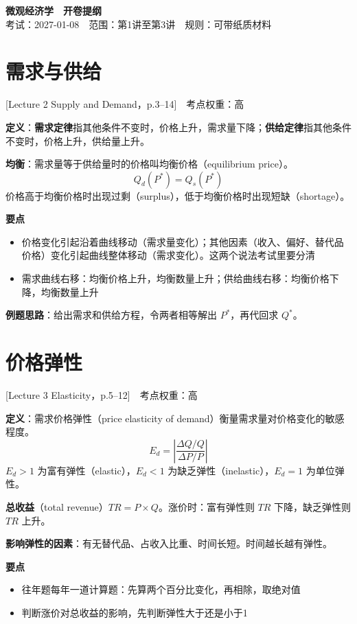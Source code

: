 \documentclass[a4paper,fontset=windows]{ctexart}
\newlength{\sbw}
\newcommand{\kw}[1]{\ifdefined\SBFILL\settowidth{\sbw}{#1}\underline{\hspace*{\dimexpr\sbw+0.6em\relax}}\else\textbf{#1}\fi}
\newcommand{\src}[1]{{\small\color{gray}[#1]}}
\begin{document}
\begin{center}
{\LARGE\bfseries 微观经济学　开卷提纲}\\[4pt]
{\small 考试：2027-01-08　范围：第1讲至第3讲　规则：可带纸质材料}
\end{center}
\setcounter{tocdepth}{2}
\tableofcontents

\section{需求与供给}\label{sec:sd}
\src{Lecture 2 Supply and Demand，p.3--14}　考点权重：高

\textbf{定义}：\kw{需求定律}指其他条件不变时，价格上升，需求量下降；\kw{供给定律}指其他条件不变时，价格上升，供给量上升。

\textbf{均衡}：需求量等于供给量时的价格叫均衡价格（equilibrium price）。
\[ Q_d(P^*) = Q_s(P^*) \]
价格高于均衡价格时出现过剩（surplus），低于均衡价格时出现短缺（shortage）。

\textbf{要点}
\begin{itemize}
\item 价格变化引起沿着曲线移动（需求量变化）；其他因素（收入、偏好、替代品价格）变化引起曲线整体移动（需求变化）。这两个说法考试里要分清
\item 需求曲线右移：均衡价格上升，均衡数量上升；供给曲线右移：均衡价格下降，均衡数量上升
\end{itemize}

\textbf{例题思路}：给出需求和供给方程，令两者相等解出 $P^*$，再代回求 $Q^*$。

\section{价格弹性}\label{sec:pe}
\src{Lecture 3 Elasticity，p.5--12}　考点权重：高

\textbf{定义}：需求价格弹性（price elasticity of demand）衡量需求量对价格变化的敏感程度。
\[ E_d = \left| \frac{\Delta Q / Q}{\Delta P / P} \right| \]
$E_d > 1$ 为富有弹性（elastic），$E_d < 1$ 为缺乏弹性（inelastic），$E_d = 1$ 为单位弹性。

\textbf{总收益}（total revenue）$TR = P \times Q$。涨价时：富有弹性则 $TR$ 下降，缺乏弹性则 $TR$ 上升。

\textbf{影响弹性的因素}：有无替代品、占收入比重、时间长短。时间越长越有弹性。

\textbf{要点}
\begin{itemize}
\item 往年题每年一道计算题：先算两个百分比变化，再相除，取绝对值
\item 判断涨价对总收益的影响，先判断弹性大于还是小于1
\end{itemize}
\end{document}
